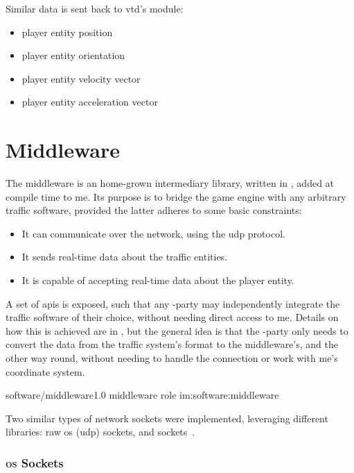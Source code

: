 Similar data is sent back to \gls{vtd}'s  module:

\begin{itemize}
	\item player entity position
	\item player entity orientation
	\item player entity velocity vector
	\item player entity acceleration vector
\end{itemize}

\section{Middleware}\label{sc:software:middleware}

The middleware is an home-grown intermediary library, written in ,  added at compile time to \gls{me}. Its purpose is to bridge the game engine with any arbitrary traffic software, provided the latter adheres to some basic constraints:

\begin{itemize}
	\item It can communicate over the network, using the \gls{udp} protocol.
	\item It sends real-time data about the traffic entities.
	\item It is capable of accepting real-time data about the player entity.
\end{itemize}

A set of \glspl{api} is exposed, such that any -party may independently integrate the traffic software of their choice, without needing direct access to \gls{me}. Details on how this is achieved are in , but the general idea is that the -party only needs to convert the data from the traffic system's format to the \gls{middleware}'s, and the other way round, without needing to handle the connection or work with \gls{me}'s coordinate system.

\begin{image}
	{software/middleware}{1.0}
	{\gls{middleware} role}
	{im:software:middleware}
	{}
\end{image}

Two similar types of network sockets were implemented, leveraging different libraries: raw \gls{os} (\gls{udp}) sockets, and  sockets~\cite{software:zmq}.

\subsubsection{\textsc{os} Sockets}

